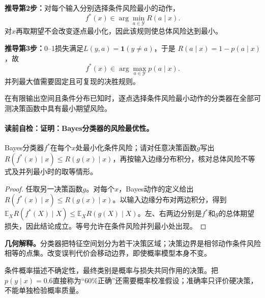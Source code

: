 \textbf{推导第2步：}对每个输入分别选择条件风险最小的动作，
\[
f^*(x)\in\arg\min_{a\in\mathcal Y}R(a\mid x).
\]
对$x$再取期望不会改变逐点最小化，因此该规则使总体风险达到最小。

\textbf{推导第3步：}0--1损失满足$L(y,a)=\mathbf 1(y\ne a)$，于是
$R(a\mid x)=1-p(a\mid x)$，故
\[
f^*(x)\in\arg\max_{a\in\mathcal Y}p(a\mid x).
\]
并列最大值需要固定且可复现的决胜规则。

\label{struct:V1-C11-CH12}
\begin{theorem}[Bayes分类器的风险最优性]
在有限输出空间且条件分布已知时，逐点选择条件风险最小动作的分类器在全部可测决策函数中具有最小期望风险。
\end{theorem}

\label{struct:V1-C11-CH13}
\paragraph{读前自检：证明：Bayes分类器的风险最优性。}Bayes分类器$f^*$在每个$x$处最小化条件风险；请对任意决策函数$g$写出$R(f^*(x)\mid x)\le R(g(x)\mid x)$，再按输入边缘分布积分，核对总体风险不等式及并列最小时的取等情形。\par

\begin{proof}
任取另一决策函数$g$。对每个$x$，Bayes动作的定义给出
$R(f^*(x)\mid x)\le R(g(x)\mid x)$。以输入边缘分布对两边积分，得到
$\mathbb E_XR(f^*(X)\mid X)\le\mathbb E_XR(g(X)\mid X)$。左、右两边分别是$f^*$和$g$的总体期望损失，因此结论成立。等号允许在条件风险并列最小处出现。
\end{proof}

\label{struct:V1-C11-CH14}
\begin{geometrybox}
\textbf{几何解释。}分类器把特征空间划分为若干决策区域；决策边界是相邻动作条件风险相等的点集。改变误判代价会移动边界，即使概率模型本身不变。
\end{geometrybox}

\label{struct:V1-C11-CH15}
\begin{probabilitybox}
条件概率描述不确定性，最终类别是概率与损失共同作用的决策。把$p(y\mid x)=0.6$直接称为“60\%正确”还需要概率校准假设；准确率只评价硬决策，不能单独检验概率质量。
\end{probabilitybox}

